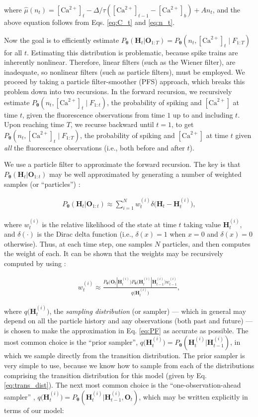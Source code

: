 \documentclass[10pt]{article}
\providecommand{\ve}[1]{\boldsymbol{#1}}
\providecommand{\ve}[1]{\boldsymbol{#1}}
\newcommand{\thetn}{\ve{\theta}}
\newcommand{\p}{P_{\thetn}}
\newcommand{\q}{q\big(\ve{H}_t^{(i)}\big)}
\newcommand{\Ca}{[\text{Ca}^{2+}]}
\begin{document}
\noindent where $\widehat{\mu}(n_t)=\Ca_t - \Delta/\tau(\Ca_{t-1}-\Ca_b) + A n_t$, and the above equation follows from Eqs. \ref{eq:C_t} and \ref{eq:n_t}.

Now the goal is to efficiently estimate $\p(\ve{H}_t | \ve{O}_{1:T})=\p(n_t, \Ca_t \mid F_{1:T})$  for all $t$. Estimating this distribution is problematic, because spike trains are inherently nonlinear.  Therefore, linear filters (such as the Wiener filter), are inadequate, so nonlinear filters (such as particle filters), must be employed.   We proceed by taking a particle filter-smoother (PFS) approach, which breaks this problem down into two recursions.  In the forward recursion, we recursively estimate $\p(n_t, \Ca_t \mid F_{1:t})$, the probability of spiking and $\Ca$ at time $t$, given the fluorescence observations from time $1$ up to and including $t$.  Upon reaching time $T$, we recurse backward until $t=1$, to get $\p(n_t, \Ca_t \mid  F_{1:T})$, the probability of spiking and $\Ca$ at time $t$ given \emph{all} the fluorescence observations (i.e., both before and after $t$).

We use a particle filter to approximate the forward recursion.  The key is that $\p(\ve{H}_t | \ve{O}_{1:t})$ may be well approximated by generating a number of weighted samples (or ``particles'') \cite{DoucetGordon01}:

\begin{align} \label{eq:PF}
\p(\ve{H}_t |  \ve{O}_{1:t}) \approx \sum_{i=1}^N w_t^{(i)} \delta \big( \ve{H}_t - \ve{H}_t^{(i)}\big),
\end{align}

\noindent where $w_t^{(i)}$ is the relative likelihood of the state at time $t$ taking value $\ve{H}_t^{(i)}$, and $\delta(\cdot)$ is the Dirac delta function (i.e., $\delta(x)=1$ when $x=0$ and $\delta(x)=0$ otherwise). Thus, at each time step, one samples $N$ particles, and then computes the weight of each. It can be shown that the weights may be recursively computed by using \cite{DoucetGordon01}:

\begin{align} \label{eq:WEIGHT}
w_t^{(i)} \approx  \frac{\p\big(\ve{O}_t | \ve{H}_t^{(i)}\big) \p\big(\ve{H}_t^{(i)} | \ve{H}_{t-1}^{(i)}\big) w_{t-1}^{(i)}}{\q},
\end{align}

\noindent where $\q$, the \emph{sampling distribution} (or sampler) --- which in general may depend on all the particle history and any observations (both past and future) --- is chosen to make the approximation in Eq. \ref{eq:PF} as accurate as possible. The most common choice is the ``prior sampler'',  $\q=\p(\ve{H}_t^{(i)} | \ve{H}_{t-1}^{(i)})$, in which we sample directly from the transition distribution. The prior sampler is very simple to use, because we know how to sample from each of the distributions comprising the transition distribution for this model  (given by Eq. \ref{eq:trans_dist}). The next most common choice is the ``one-observation-ahead sampler'' \cite{DoucetGordon01},  $\q=\p(\ve{H}_t^{(i)} | \ve{H}_{t-1}^{(i)}, \ve{O}_t)$, which may be written explicitly in terms of our model:
\end{document}
